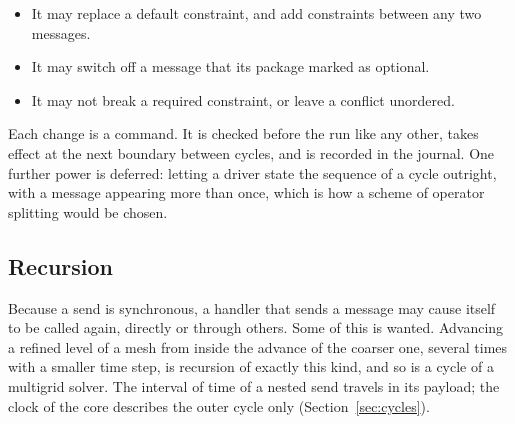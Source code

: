\documentclass[11pt,a4paper]{article}
\begin{document}
\begin{itemize}
  \item It may replace a default constraint, and add constraints between any
        two messages.
  \item It may switch off a message that its package marked as optional.
  \item It may not break a required constraint, or leave a conflict
        unordered.
\end{itemize}

Each change is a command.  It is checked before the run like any other,
takes effect at the next boundary between cycles, and is recorded in the
journal.  One further power is deferred: letting a driver state the sequence
of a cycle outright, with a message appearing more than once, which is how
a scheme of operator splitting would be chosen.

\subsection{Recursion}
\label{sec:recursion}

Because a send is synchronous, a handler that sends a message may cause
itself to be called again, directly or through others.  Some of this is
wanted.  Advancing a refined level of a mesh from inside the advance of the
coarser one, several times with a smaller time step, is recursion of exactly
this kind, and so is a cycle of a multigrid solver.  The interval of time
of a nested send travels in its payload; the clock of the core describes the
outer cycle only (Section~\ref{sec:cycles}).
\end{document}

